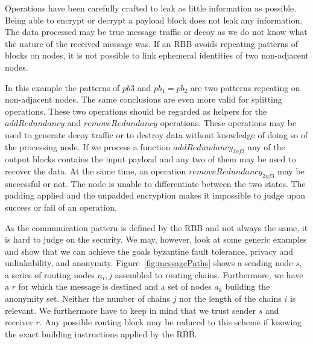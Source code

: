 \documentclass[acmsmall, screen]{acmart}
\begin{document}
Operations have been carefully crafted to leak as little information as possible. Being able to encrypt or decrypt a payload block does not leak any information. The data processed may be true message traffic or decoy as we do not know what the nature of the received message was. If an RBB avoids repeating patterns of blocks on nodes, it is not possible to link ephemeral identities of two non-adjacent nodes. 

%
In this example the patterns of $pb3$ and $pb_4=pb_2$ are two patterns repeating on non-adjacent nodes. The same conclusions are even more valid for splitting operations. These two operations should be regarded as helpers for the $addRedundancy$ and $removeRedundancy$ operations. These operations may be used to generate decoy traffic or to destroy data without knowledge of doing so of the processing node. If we process a function $addRedundancy_{2 of 3}$ any of the output blocks contains the input payload and any two of them may be used to recover the data. At the same time, an operation $removeRedundancy_{2 of 3}$ may be successful or not. The node is unable to differentiate between the two states. The padding applied and the unpadded encryption makes it impossible to judge upon success or fail of an operation.

As the communication pattern is defined by the RBB and not always the same, it is hard to judge on the security. We may, however, look at some generic examples and show that we can achieve the goals byzantine fault tolerance, privacy and unlinkability, and anonymity. Figure~\ref{fig:messagePaths} shows a sending node $s$, a series of routing nodes $n_i,j$ assembled to routing chains. Furthermore, we have a $r$ for which the message is destined and a set of nodes $a_k$ building the anonymity set. Neither the number of chains $j$ nor the length of the chains $i$ is relevant. We furthermore have to keep in mind that we trust sender $s$ and receiver $r$. Any possible routing block may be reduced to this scheme if knowing the exact building instructions applied by the RBB.
\end{document}
